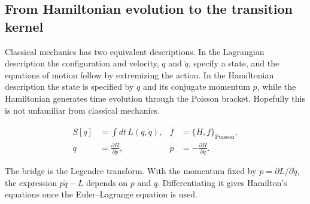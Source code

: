 
\subsection{From Hamiltonian evolution to the transition kernel}

Classical mechanics has two equivalent descriptions.  In the Lagrangian
description the configuration and velocity, $q$ and $\dot q$, specify a state,
and the equations of motion follow by extremizing the action.  In the
Hamiltonian description the state is specified by $q$ and its conjugate
momentum $p$, while the Hamiltonian generates time evolution through the
Poisson bracket.  Hopefully this is not unfamiliar from classical mechanics.

\begin{align}
  S[q] &= \int dt\,L(q,\dot q),
  & \dot f &= \{H,f\}_{\mathrm{Poisson}},
  \label{eq:proposal-classical-descriptions}\\
  \dot q &= \frac{\partial H}{\partial p},
  & \dot p &= -\frac{\partial H}{\partial q}.
  \label{eq:proposal-hamilton-equations}
\end{align}

The bridge is the Legendre transform.  With the momentum fixed by
$p=\partial L/\partial\dot q$, the expression $p\dot q-L$ depends on $p$ and
$q$.  Differentiating it gives Hamilton's equations once the Euler--Lagrange
equation is used.

